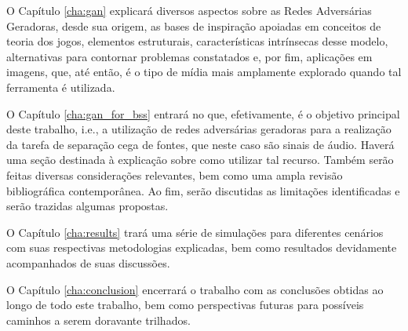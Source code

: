 O Capítulo \ref{cha:gan} explicará diversos aspectos sobre as Redes Adversárias Geradoras, desde sua origem, as bases de inspiração apoiadas em conceitos de teoria dos jogos, elementos estruturais, características intrínsecas desse modelo, alternativas para contornar problemas constatados e, por fim, aplicações em imagens, que, até então, é o tipo de mídia mais amplamente explorado quando tal ferramenta é utilizada.

O Capítulo \ref{cha:gan_for_bss} entrará no que, efetivamente, é o objetivo principal deste trabalho, i.e., a utilização de redes adversárias geradoras para a realização da tarefa de separação cega de fontes, que neste caso são sinais de áudio. Haverá uma seção destinada à explicação sobre como utilizar tal recurso. Também serão feitas diversas considerações relevantes, bem como uma ampla revisão bibliográfica contemporânea. Ao fim, serão discutidas as limitações identificadas e serão trazidas algumas propostas.

O Capítulo \ref{cha:results} trará uma série de simulações para diferentes cenários com suas respectivas metodologias explicadas, bem como resultados devidamente acompanhados de suas discussões.

O Capítulo \ref{cha:conclusion} encerrará o trabalho com as conclusões obtidas ao longo de todo este trabalho, bem como perspectivas futuras para possíveis caminhos a serem doravante trilhados.
